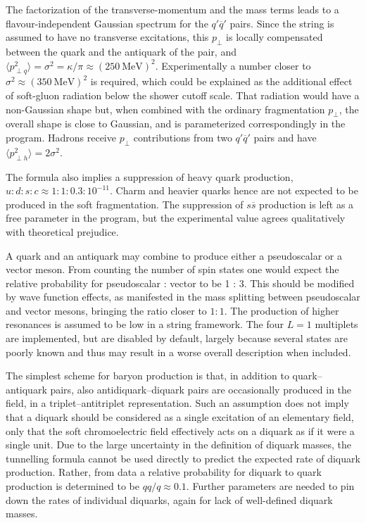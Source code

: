 The factorization of the transverse-momentum and the mass terms leads
to a flavour-independent Gaussian spectrum for the 
$q'\overline{q}'$ pairs. Since the string is assumed to have 
no transverse excitations, this $p_{\perp}$ is locally compensated 
between the quark and the antiquark of the pair, and
$\langle p_{\perp q}^2 \rangle = \sigma^2 = \kappa/\pi 
\approx (250~\mathrm{MeV})^2$. Experimentally a number closer to 
$\sigma^2 \approx (350~\mathrm{MeV})^2$
is required, which could be explained as the additional effect of 
soft-gluon radiation below the shower cutoff scale. That radiation 
would have a non-Gaussian shape but, when combined with the ordinary 
fragmentation $p_{\perp}$, the overall shape is close to Gaussian, 
and is parameterized correspondingly in the program. Hadrons receive 
$p_{\perp}$ contributions from two $q'\overline{q}'$ pairs and have 
$\langle p_{\perp h}^2 \rangle = 2 \sigma^2$.
  
The formula also implies a suppression of heavy quark production,
$u : d : s : c \approx 1 : 1 : 0.3 : 10^{-11}$. Charm and heavier quarks
hence are not expected to be produced in the soft fragmentation.
The suppression of $s\overline{s}$ production is left as a free 
parameter in the program, but the experimental value agrees 
qualitatively with theoretical prejudice.
  
A quark and an antiquark may combine to produce either a pseudoscalar
or a vector meson. From counting the number of spin states
one would expect the relative probability for pseudoscalar : vector
to be 1 : 3. This should be modified by wave function effects, as
manifested \eg in the mass splitting between pseudoscalar and vector
mesons, bringing the ratio closer to $1 : 1$. The production of higher 
resonances is assumed to be low in a string framework. The four 
$L = 1$ multiplets are implemented, but are disabled by default, largely
because several states are poorly known and thus may result in a 
worse overall description when included. 
  
The simplest scheme for baryon production is that, in addition to
quark--antiquark pairs, also antidiquark--diquark pairs are occasionally 
produced in the field, in a triplet--antitriplet representation.
Such an assumption does not imply that a diquark should be considered as
a single excitation of an elementary field, only that the soft
chromoelectric field effectively acts on a diquark as if it were a single unit.
Due to the large uncertainty in the definition of diquark masses, the
tunnelling formula cannot be used directly to predict the expected rate of
diquark production. Rather, from data a relative probability for diquark
to quark production is determined to be $qq / q \approx 0.1$. Further
parameters are needed to pin down the rates of individual diquarks, 
again for lack of well-defined diquark masses.

